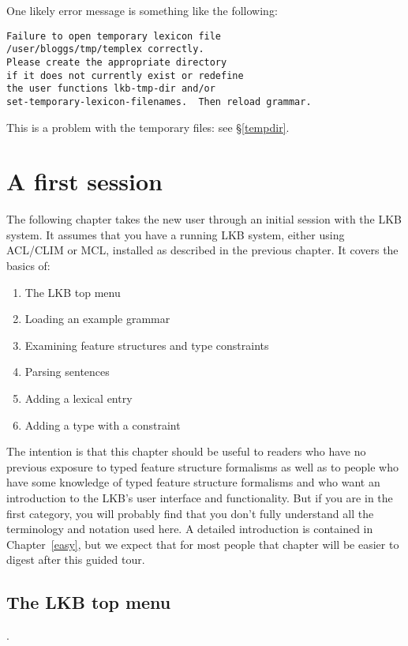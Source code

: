 \documentclass[12pt]{report}
\begin{document}
One likely error message is something like the following:
\begin{verbatim}
Failure to open temporary lexicon file 
/user/bloggs/tmp/templex correctly.
Please create the appropriate directory 
if it does not currently exist or redefine
the user functions lkb-tmp-dir and/or
set-temporary-lexicon-filenames.  Then reload grammar.
\end{verbatim}
This is a problem with the temporary files: see \S\ref{tempdir}.

\chapter{A first session}
\label{firstsession}
The following chapter takes the new user through an initial session
with the LKB system.  It assumes that you have a running LKB system,
either using ACL/CLIM or MCL,
installed as described in the previous chapter.
It covers the basics of:
\begin{enumerate}
\item The LKB top menu
\item Loading an example grammar
\item Examining feature structures and type constraints
\item Parsing sentences
\item Adding a lexical entry
\item Adding a type with a constraint
\end{enumerate}
The intention is that this chapter should be useful
to readers who have no previous exposure to
typed feature structure formalisms as well as
to people who have some knowledge of typed feature structure
formalisms and who want an introduction to the LKB's user
interface and functionality.  But if you are in the first
category, you will probably find that you don't fully understand all the
terminology and notation used here.  A detailed introduction
is contained in Chapter~\ref{easy}, but we expect that for most people
that chapter will be easier to digest after this guided tour.

\section{The LKB top menu}
\label{topmenu}.
\end{document}
